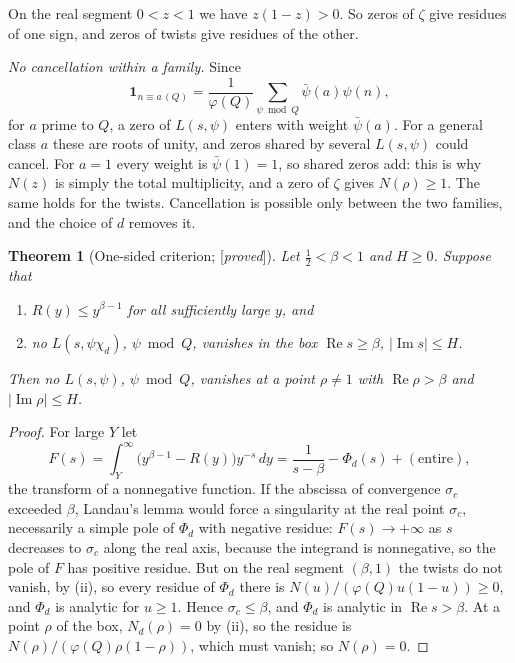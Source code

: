 \documentclass[11pt]{amsart}
\numberwithin{equation}{section}
\newtheorem{theorem}{Theorem}[section]
\theoremstyle{definition}
\theoremstyle{remark}
\newcommand{\re}{\operatorname{Re}}
\newcommand{\im}{\operatorname{Im}}
\newcommand{\status}[1]{\textup{[\emph{#1}]}}
\begin{document}
On the real segment $0<z<1$ we have $z(1-z)>0$. So zeros of $\zeta$ give residues of one sign, and zeros of twists give residues of the other.

\emph{No cancellation within a family.} Since
\begin{equation}
 \mathbf 1_{n\equiv a\,(Q)}=\frac1{\varphi(Q)}\sum_{\psi\bmod Q}\bar\psi(a)\psi(n),
\end{equation}
for $a$ prime to $Q$, a zero of $L(s,\psi)$ enters with weight $\bar\psi(a)$. For a general class $a$ these are roots of unity, and zeros shared by several $L(s,\psi)$ could cancel. For $a=1$ every weight is $\bar\psi(1)=1$, so shared zeros add: this is why $N(z)$ is simply the total multiplicity, and a zero of $\zeta$ gives $N(\rho)\ge1$. The same holds for the twists. Cancellation is possible only between the two families, and the choice of $d$ removes it.

\begin{theorem}[One-sided criterion; \status{proved}]\label{thm:criterion}
Let $\frac12<\beta<1$ and $H\ge0$. Suppose that
\begin{enumerate}[label=(\roman*),leftmargin=2.2em]
\item $R(y)\le y^{\beta-1}$ for all sufficiently large $y$, and
\item no $L(s,\psi\chi_d)$, $\psi\bmod Q$, vanishes in the box $\re s\ge\beta$, $|\im s|\le H$.
\end{enumerate}
Then no $L(s,\psi)$, $\psi\bmod Q$, vanishes at a point $\rho\ne1$ with $\re\rho>\beta$ and $|\im\rho|\le H$.
\end{theorem}

\begin{proof}
For large $Y$ let
\begin{equation}
 F(s)=\int_Y^\infty\bigl(y^{\beta-1}-R(y)\bigr)y^{-s}\,dy=\frac1{s-\beta}-\Phi_d(s)+(\text{entire}),
\end{equation}
the transform of a nonnegative function. If the abscissa of convergence $\sigma_c$ exceeded $\beta$, Landau's lemma would force a singularity at the real point $\sigma_c$, necessarily a simple pole of $\Phi_d$ with negative residue: $F(s)\to+\infty$ as $s$ decreases to $\sigma_c$ along the real axis, because the integrand is nonnegative, so the pole of $F$ has positive residue. But on the real segment $(\beta,1)$ the twists do not vanish, by (ii), so every residue of $\Phi_d$ there is $N(u)/(\varphi(Q)u(1-u))\ge0$, and $\Phi_d$ is analytic for $u\ge1$. Hence $\sigma_c\le\beta$, and $\Phi_d$ is analytic in $\re s>\beta$. At a point $\rho$ of the box, $N_d(\rho)=0$ by (ii), so the residue is $N(\rho)/(\varphi(Q)\rho(1-\rho))$, which must vanish; so $N(\rho)=0$.
\end{proof}
\end{document}
